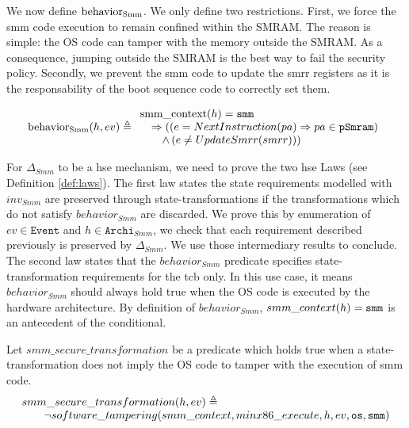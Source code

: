 
We now define $\mathrm{behavior_{Smm}}$.
%
We only define two restrictions.
%
First, we force the \ac{smm} code execution to remain confined within the SMRAM.
%
The reason is simple: the OS code can tamper with the memory outside the SMRAM.
%
As a consequence, jumping outside the SMRAM is the best way to fail the security
policy.
%
Secondly, we prevent the \ac{smm} code to update the \ac{smrr} registers as it
is the responsability of the boot sequence code to correctly set them.

\[
  \mathrm{behavior_{Smm}}(h, ev) \triangleq
  \begin{array}{l}
    \mathrm{smm\_context}(h) = \mathtt{smm} \\
    \quad \Rightarrow ((e =
    NextInstruction(pa)
    \Rightarrow pa \in \texttt{pSmram}) \\
    \qquad \wedge\,(e \neq UpdateSmrr(smrr))) \\
  \end{array}
\]

For $\Delta_{Smm}$ to be a \ac{hse} mechanism, we need to prove the two \ac{hse}
Laws (see Definition \ref{def:laws}).
%
The first law states the state requirements modelled with $inv_{Smm}$ are
preserved through state-transformations if the transformations which do not
satisfy $behavior_{Smm}$ are discarded.
%
We prove this by enumeration of $ev \in \texttt{Event}$ and
$h \in \texttt{Archi}_{Smm}$, we check that each requirement described
previously is preserved by $\Delta_{Smm}$.
%
We use those intermediary results to conclude.
%
The second law states that the $behavior_{Smm}$ predicate specifies
state-trans\-formation requirements for the \ac{tcb} only.
%
In this use case, it means $behavior_{Smm}$ should always hold true when the OS
code is executed by the hardware architecture.
%
By definition of $behavior_{Smm}$, $smm\_context(h) = \mathtt{smm}$ is an
antecedent of the conditional.

Let $smm\_secure\_transformation$ be a predicate which holds true when a
state-transformation does not imply the OS code to tamper with the execution of
\ac{smm} code.
\[ \begin{array}{l}
     smm\_secure\_transformation(h, ev) \triangleq \\
     \qquad \neg software\_tampering(smm\_context, minx86\_execute, h, ev,
     \mathtt{os}, \mathtt{smm})
   \end{array} \]

